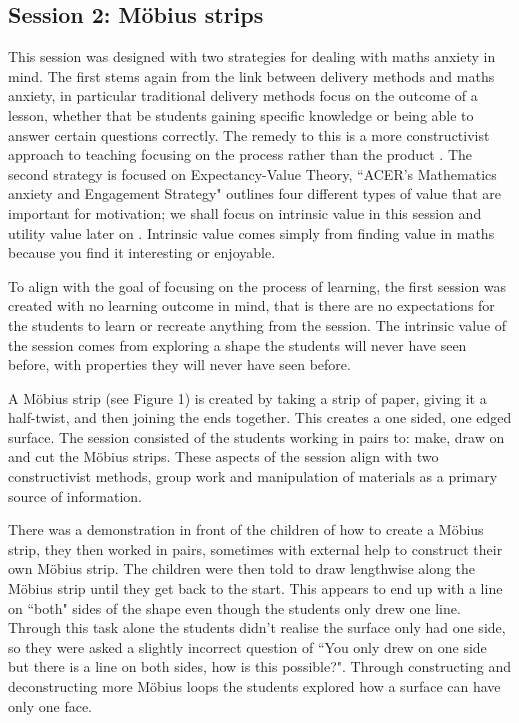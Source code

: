 \documentclass[11pt, a4paper, notitlepage]{article}
\begin{document}
\subsection{Session 2: M\"obius strips}
This session was designed with two strategies for dealing with maths anxiety in mind. The first stems again from the link between delivery methods and maths anxiety, in particular traditional delivery methods focus on the outcome of a lesson, whether that be students gaining specific knowledge or being able to answer certain questions correctly. The remedy to this is a more constructivist approach to teaching focusing on the process rather than the product \cite{Finlayson:2014}. The second strategy is focused on Expectancy-Value Theory, ``ACER's Mathematics anxiety and Engagement Strategy" outlines four different types of value that are important for motivation; we shall focus on intrinsic value in this session and utility value later on \cite{MAES:2024} . Intrinsic value comes simply from finding value in maths because you find it interesting or enjoyable.
\par
To align with the goal of focusing on the process of learning, the first session was created with no learning outcome in mind, that is there are no expectations for the students to learn or recreate anything from the session. The intrinsic value of the session comes from exploring a shape the students will never have seen before, with properties they will never have seen before. 
\par
A M\"obius strip (see Figure 1) is created by taking a strip of paper, giving it a half-twist, and then joining the ends together. This creates a one sided, one edged surface. The session consisted of the students working in pairs to: make, draw on and cut the M\"obius strips. These aspects of the session align with two constructivist methods, group work and manipulation of materials as a primary source of information. 
\par
There was a demonstration in front of the children of how to create a M\"obius strip, they then worked in pairs, sometimes with external help to construct their own M\"obius strip. The children were then told to draw lengthwise along the M\"obius strip until they get back to the start. This appears to end up with a line on ``both" sides of the shape even though the students only drew one line. Through this task alone the students didn't realise the surface only had one side, so they were asked a slightly incorrect question of ``You only drew on one side but there is a line on both sides, how is this possible?". Through constructing and deconstructing more M\"obius loops the students explored how a surface can have only one face.
\end{document}
